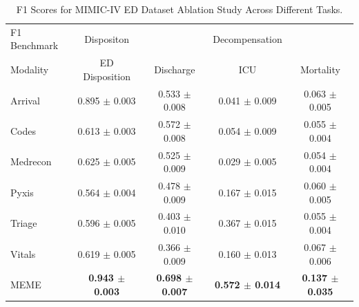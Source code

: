 \documentclass[pmlr]{jmlr}%
\begin{document}
\begin{table}[H]
\caption{F1 Scores for MIMIC-IV ED Dataset Ablation Study Across Different Tasks.}
\label{r4}
\begin{adjustbox}{width=\textwidth}
\begin{small}
\begin{sc}
\begin{tabular}{l|c|ccc}
\toprule
F1 Benchmark & Dispositon & & Decompensation &\\
Modality & ED Disposition & Discharge & ICU & Mortality \\
\midrule
Arrival & 0.895 $\pm$ 0.003 & 0.533 $\pm$ 0.008 & 0.041 $\pm$ 0.009 & 0.063 $\pm$ 0.005 \\
Codes & 0.613 $\pm$ 0.003 & 0.572 $\pm$ 0.008 & 0.054 $\pm$ 0.009 & 0.055 $\pm$ 0.004 \\
Medrecon & 0.625 $\pm$ 0.005 & 0.525 $\pm$ 0.009 & 0.029 $\pm$ 0.005 & 0.054 $\pm$ 0.004 \\
Pyxis & 0.564 $\pm$ 0.004 & 0.478 $\pm$ 0.009 & 0.167 $\pm$ 0.015 & 0.060 $\pm$ 0.005 \\
Triage & 0.596 $\pm$ 0.005 & 0.403 $\pm$ 0.010 & 0.367 $\pm$ 0.015 & 0.055 $\pm$ 0.004 \\
Vitals & 0.619 $\pm$ 0.005 & 0.366 $\pm$ 0.009 & 0.160 $\pm$ 0.013 & 0.067 $\pm$ 0.006 \\
MEME & \textbf{0.943 $\pm$ 0.003} & \textbf{0.698 $\pm$ 0.007} & \textbf{0.572 $\pm$ 0.014} & \textbf{0.137 $\pm$ 0.035} \\
\bottomrule
\end{tabular}
\end{sc}
\end{small}
\end{adjustbox}
\end{table}
\end{document}
